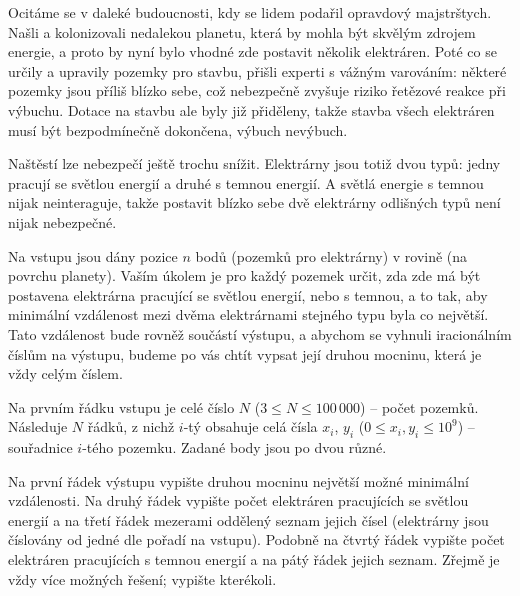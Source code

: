 
\usepackage[czech]{babel}





Ocitáme se v daleké budoucnosti, kdy se lidem podařil opravdový majstrštych. Našli a kolonizovali nedalekou planetu,
která by mohla být skvělým zdrojem energie, a proto by nyní bylo vhodné zde postavit několik elektráren.
Poté co se určily a upravily pozemky pro stavbu, přišli experti s vážným varováním:
některé pozemky jsou příliš blízko sebe, což nebezpečně zvyšuje riziko řetězové reakce při výbuchu.
Dotace na stavbu ale byly již přiděleny, takže stavba všech elektráren musí být bezpodmínečně dokončena,
výbuch nevýbuch.

Naštěstí lze nebezpečí ještě trochu snížit. Elektrárny jsou totiž dvou typů: jedny pracují
se světlou energií a druhé s temnou energií. A světlá energie s temnou nijak neinteraguje, takže
postavit blízko sebe dvě elektrárny odlišných typů není nijak nebezpečné.




Na vstupu jsou dány pozice $n$ bodů (pozemků pro elektrárny) v rovině (na povrchu planety).
Vaším úkolem je pro každý pozemek určit, zda zde má být postavena elektrárna pracující se světlou energií, nebo s temnou, a to tak, aby minimální vzdálenost mezi dvěma elektrárnami stejného typu byla co největší.
Tato vzdálenost bude rovněž součástí výstupu, a abychom se vyhnuli iracionálním číslům na výstupu,
budeme po vás chtít vypsat její druhou mocninu, která je vždy celým číslem.


Na prvním řádku vstupu je celé číslo $N$ ($3 \leq N \leq 100\,000$) -- počet pozemků.
Následuje $N$ řádků, z nichž $i$-tý obsahuje celá čísla $x_i$, $y_i$ ($0 \leq x_i, y_i \leq 10^9$)
-- souřadnice $i$-tého pozemku. Zadané body jsou po dvou různé.


Na první řádek výstupu vypište druhou mocninu největší možné minimální vzdálenosti.
Na druhý řádek vypište počet elektráren pracujících se světlou energií a na třetí řádek mezerami oddělený
seznam jejich čísel (elektrárny jsou číslovány od jedné dle pořadí na vstupu).
Podobně na čtvrtý řádek vypište počet elektráren pracujících s temnou energií a na pátý řádek jejich seznam.
Zřejmě je vždy více možných řešení; vypište kterékoli.

